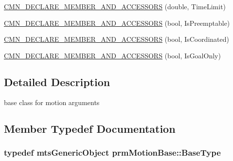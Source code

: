 {\bf }\par
\begin{DoxyCompactItemize}
\item 
\hyperlink{classprm_motion_base_a843aed0d6371bf0dd33c763bc94c8ea3}{C\+M\+N\+\_\+\+D\+E\+C\+L\+A\+R\+E\+\_\+\+M\+E\+M\+B\+E\+R\+\_\+\+A\+N\+D\+\_\+\+A\+C\+C\+E\+S\+S\+O\+R\+S} (double, Time\+Limit)
\end{DoxyCompactItemize}

{\bf }\par
\begin{DoxyCompactItemize}
\item 
\hyperlink{classprm_motion_base_ac5ccd565d71aa9c29b857a2adf02a522}{C\+M\+N\+\_\+\+D\+E\+C\+L\+A\+R\+E\+\_\+\+M\+E\+M\+B\+E\+R\+\_\+\+A\+N\+D\+\_\+\+A\+C\+C\+E\+S\+S\+O\+R\+S} (bool, Is\+Preemptable)
\end{DoxyCompactItemize}

{\bf }\par
\begin{DoxyCompactItemize}
\item 
\hyperlink{classprm_motion_base_a5cadf4180ea1b4894065f53a6840a942}{C\+M\+N\+\_\+\+D\+E\+C\+L\+A\+R\+E\+\_\+\+M\+E\+M\+B\+E\+R\+\_\+\+A\+N\+D\+\_\+\+A\+C\+C\+E\+S\+S\+O\+R\+S} (bool, Is\+Coordinated)
\end{DoxyCompactItemize}

{\bf }\par
\begin{DoxyCompactItemize}
\item 
\hyperlink{classprm_motion_base_a105f088e102123a82f6aae73212d4c9c}{C\+M\+N\+\_\+\+D\+E\+C\+L\+A\+R\+E\+\_\+\+M\+E\+M\+B\+E\+R\+\_\+\+A\+N\+D\+\_\+\+A\+C\+C\+E\+S\+S\+O\+R\+S} (bool, Is\+Goal\+Only)
\end{DoxyCompactItemize}



\subsection{Detailed Description}
base class for motion arguments 

\subsection{Member Typedef Documentation}
\hypertarget{classprm_motion_base_aef2350979e92dcdd61088ee026a8b87b}{}
\subsubsection[{Base\+Type}]{\setlength{\rightskip}{0pt plus 5cm}typedef {\bf mts\+Generic\+Object} {\bf prm\+Motion\+Base\+::\+Base\+Type}}\label{classprm_motion_base_aef2350979e92dcdd61088ee026a8b87b}


